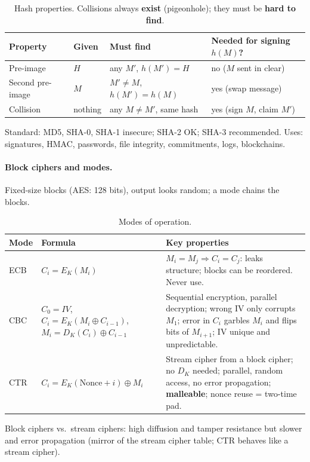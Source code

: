 \begin{table}[h]
\centering
\begin{tabular}{@{}llll@{}}
\toprule
\textbf{Property} & \textbf{Given} & \textbf{Must find} & \textbf{Needed for signing $h(M)$?} \\
\midrule
Pre-image & $H$ & any $M'$, $h(M') = H$ & no ($M$ sent in clear) \\
Second pre-image & $M$ & $M' \neq M$, $h(M') = h(M)$ & yes (swap message) \\
Collision & nothing & any $M \neq M'$, same hash & yes (sign $M$, claim $M'$) \\
\bottomrule
\end{tabular}
\caption{Hash properties. Collisions always \textbf{exist} (pigeonhole); they must be \textbf{hard to find}.}
\end{table}
Standard: MD5, SHA-0, SHA-1 insecure; SHA-2 OK; SHA-3 recommended. Uses: signatures, HMAC, passwords, file integrity, commitments, logs, blockchains.

\paragraph{Block ciphers and modes.} Fixed-size blocks (AES: 128 bits), output looks random; a mode chains the blocks.

\begin{table}[h]
\centering
\small
\begin{tabular}{@{}p{1.4cm}p{4.3cm}p{8.2cm}@{}}
\toprule
\textbf{Mode} & \textbf{Formula} & \textbf{Key properties} \\
\midrule
ECB & $C_i = E_K(M_i)$ & $M_i = M_j \Rightarrow C_i = C_j$: leaks structure; blocks can be reordered. Never use. \\[3pt]
CBC & $C_0 = IV$, $C_i = E_K(M_i \oplus C_{i-1})$, $M_i = D_K(C_i) \oplus C_{i-1}$ & Sequential encryption, parallel decryption; wrong IV only corrupts $M_1$; error in $C_i$ garbles $M_i$ and flips bits of $M_{i+1}$; IV unique and unpredictable. \\[3pt]
CTR & $C_i = E_K(\mathrm{Nonce}+i) \oplus M_i$ & Stream cipher from a block cipher; no $D_K$ needed; parallel, random access, no error propagation; \textbf{malleable}; nonce reuse = two-time pad. \\
\bottomrule
\end{tabular}
\caption{Modes of operation.}
\end{table}

Block ciphers vs.\ stream ciphers: high diffusion and tamper resistance but slower and error propagation (mirror of the stream cipher table; CTR behaves like a stream cipher).

